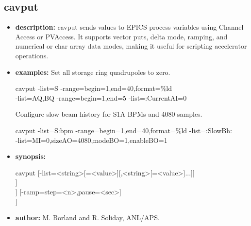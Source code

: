 \newpage
\subsection{cavput}
\label{cavput}

\begin{itemize}
  \item {\bf description:}
    cavput sends values to EPICS process variables using Channel Access or PVAccess. It supports vector puts, delta mode, ramping, and numerical or char array data modes, making it useful for scripting accelerator operations.
  \item {\bf examples:}
    Set all storage ring quadrupoles to zero.
    \begin{flushleft}\ttfamily
    cavput -list=S -range=begin=1,end=40,format=\%ld\\
      -list=AQ,BQ -range=begin=1,end=5 -list=:CurrentAI=0
    \end{flushleft}
    Configure slow beam history for S1A BPMs and 4080 samples.
    \begin{flushleft}\ttfamily
    cavput -list=S:bpm -range=begin=1,end=40,format=\%ld -list=:SlowBh:\\
      -list=MI=0,sizeAO=4080,modeBO=1,enableBO=1
    \end{flushleft}
  \item {\bf synopsis:}
    \begin{flushleft}\ttfamily
    cavput [-list=<string>[=<value>][,<string>[=<value>]...]]\\\relax
      [-range=begin=<integer>,end=<integer>[,format=<string>][,interval=<integer>]]\\\relax
      [-pendIoTime=<seconds>] [-deltaMode[=factor=<value>]] [-ramp=step=<n>,pause=<sec>]\\\relax
      [-numerical] [-charArray] [-blunderAhead[=silently]]\\\relax
      [-provider=\{ca|pva\}]
    \end{flushleft}
  \item {\bf author:} M. Borland and R. Soliday, ANL/APS.
\end{itemize}
